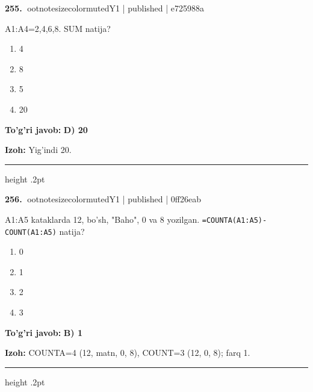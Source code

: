 \documentclass[10pt,a4paper]{article}
\begin{document}
\textbf{\color{ink}255.} {ootnotesizecolor{muted}Y1 | published | e725988a}
\par
A1:A4=2,4,6,8. SUM natija?
\begin{enumerate}[label=\Alph*),leftmargin=9mm]
\item 4
\item 8
\item 5
\item 20
\end{enumerate}
\begin{tcolorbox}[enhanced,breakable,colback=teal!4,colframe=teal!55!black,boxrule=0.45pt,arc=1.2mm,left=2.8mm,right=2.8mm,top=2mm,bottom=2mm]
\textbf{\color{teal}To'g'ri javob:} \textbf{D) 20}
\par\smallskip
\textbf{Izoh:} Yig'indi 20.
\end{tcolorbox}
\vspace{2mm}\hrule height .2pt\vspace{2mm}

\textbf{\color{ink}256.} {ootnotesizecolor{muted}Y1 | published | 0ff26eab}
\par
A1:A5 kataklarda 12, bo'sh, "Baho", 0 va 8 yozilgan. \texttt{=COUNTA(A1:A5)-COUNT(A1:A5)} natija?
\begin{enumerate}[label=\Alph*),leftmargin=9mm]
\item 0
\item 1
\item 2
\item 3
\end{enumerate}
\begin{tcolorbox}[enhanced,breakable,colback=teal!4,colframe=teal!55!black,boxrule=0.45pt,arc=1.2mm,left=2.8mm,right=2.8mm,top=2mm,bottom=2mm]
\textbf{\color{teal}To'g'ri javob:} \textbf{B) 1}
\par\smallskip
\textbf{Izoh:} COUNTA=4 (12, matn, 0, 8), COUNT=3 (12, 0, 8); farq 1.
\end{tcolorbox}
\vspace{2mm}\hrule height .2pt\vspace{2mm}
\end{document}

